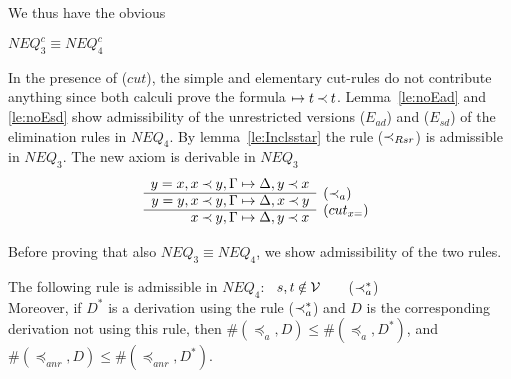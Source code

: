 %
We thus  have the obvious
\begin{LEMMA}\label{le:neq3cisneq4c}
 $NEQ_3^c \equiv NEQ_4^c$
\end{LEMMA}
\begin{PROOF}
In the presence of ($cut$), the simple and elementary cut-rules do not
contribute anything since both calculi prove the formula $\mathrel{\mapsto} t\mathbin{\prec} t$.
Lemma~\ref{le:noEad} and \ref{le:noEsd} show admissibility of the unrestricted
versions ($E_{ad}$) and ($E_{sd}$) of the elimination rules in $NEQ_4$.
By lemma~\ref{le:Inclsstar} the rule ($\mathbin{\prec}_{Rsr}$) is admissible in $NEQ_3$.
The new axiom is derivable in $NEQ_3$
\[
\prar{
y=x, x\Incl y,\GSD,y\Incl x \cl
y=y, x\Incl y,\GSD,x\Incl y & \rabove{(\Incl_{a})} \cl
 x\Incl y,\GSD, y\Incl x & \rabove{(cut_{x=})}
}
\]
\end{PROOF}
\noindent
Before proving that also $NEQ_3\equiv
NEQ_4$, we show admissibility of the two rules.
%
\begin{LEMMA}\label{le:inclaad} The following rule is admissible in $NEQ_4$:
\ $s,t\not\in\Vars$\ \ \ \ ($\mathbin{\prec}_a^*$) \\
Moreover, if $D^*$ is a derivation using the rule ($\mathbin{\prec}_a^*$) and $D$ is the corresponding
derivation not using this rule, then $\#(\preceq_a,D)\leq\#(\preceq_a,D^*)$, and
$\#(\preceq_{anr},D)\leq\#(\preceq_{anr},D^*)$. \\ 
\end{LEMMA}
